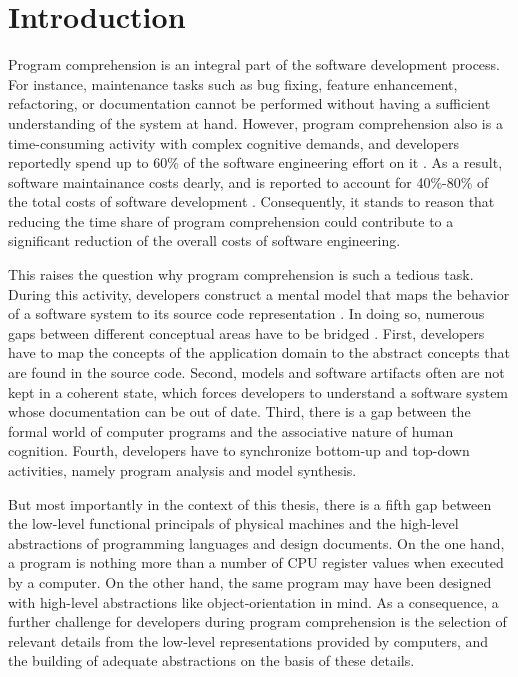 \chapter{Introduction}
\label{c:introduction}
Program comprehension is an integral part of the software development process.
For instance, maintenance tasks such as bug fixing, feature enhancement, refactoring, or documentation cannot be performed without having a sufficient understanding of the system at hand.
However, program comprehension also is a time-consuming activity with complex cognitive demands, and developers reportedly spend up to 60\% of the software engineering effort on it \cite{corbi_program_1989, basili_evolving_1997, ducasse_class_2005, rothlisberger_feature_2007, cornelissen_execution_2008}.
As a result, software maintainance costs dearly, and is reported to account for 40\%-80\% of the total costs of software development \cite{glass_frequently_2001}.
Consequently, it stands to reason that reducing the time share of program comprehension could contribute to a significant reduction of the overall costs of software engineering.

This raises the question why program comprehension is such a tedious task.
During this activity, developers construct a mental model that maps the behavior of a software system to its source code representation \cite{latoza_maintaining_2006}.
In doing so, numerous gaps between different conceptual areas have to be bridged \cite{kent_program_1996}.
First, developers have to map the concepts of the application domain to the abstract concepts that are found in the source code.
Second, models and software artifacts often are not kept in a coherent state, which forces developers to understand a software system whose documentation can be out of date.
Third, there is a gap between the formal world of computer programs and the associative nature of human cognition.
Fourth, developers have to synchronize bottom-up and top-down activities, namely program analysis and model synthesis.

But most importantly in the context of this thesis, there is a fifth gap between the low-level functional principals of physical machines and the high-level abstractions of programming languages and design documents.
On the one hand, a program is nothing more than a number of CPU register values when executed by a computer.
On the other hand, the same program may have been designed with high-level abstractions like object-orientation in mind.
As a consequence, a further challenge for developers during program comprehension is the selection of relevant details from the low-level representations provided by computers, and the building of adequate abstractions on the basis of these details.

